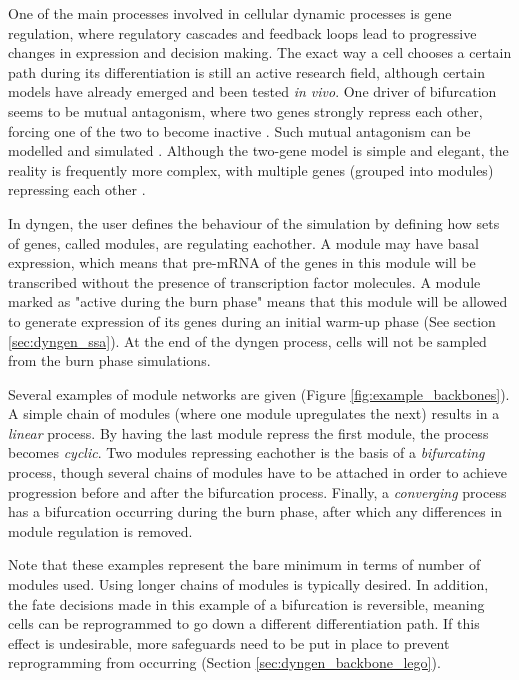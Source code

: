 One of the main processes involved in cellular dynamic processes is gene regulation, where regulatory cascades and feedback loops lead to progressive changes in expression and decision making. The exact way a cell chooses a certain path during its differentiation is still an active research field, although certain models have already emerged and been tested \textit{in vivo}. One driver of bifurcation seems to be mutual antagonism, where two genes \cite{xu_regulationbifurcatingcell_2015} strongly repress each other, forcing one of the two to become inactive \cite{graf_forcingcellschange_2009}. Such mutual antagonism can be modelled and simulated \cite{wang_quantifyingwaddingtonlandscape_2011, ferrell_bistabilitybifurcationswaddington_2012}. Although the two-gene model is simple and elegant, the reality is frequently more complex, with multiple genes (grouped into modules) repressing each other \cite{yosef_dynamicregulatorynetwork_2013}.

In dyngen, the user defines the behaviour of the simulation by defining how sets of genes, called modules, are regulating eachother.
A module may have basal expression, which means that pre-mRNA of the genes in this module will be transcribed without the presence of transcription factor molecules. A module marked as "active during the burn phase" means that this module will be allowed to generate expression of its genes during an initial warm-up phase (See section \ref{sec:dyngen_ssa}). At the end of the dyngen process, cells will not be sampled from the burn phase simulations.

Several examples of module networks are given (Figure \ref{fig:example_backbones}). 
A simple chain of modules (where one module upregulates the next) results in a \emph{linear} process. By having the last module repress the first module, the process becomes \emph{cyclic}. Two modules repressing eachother is the basis of a \emph{bifurcating} process, though several chains of modules have to be attached in order to achieve progression before and after the bifurcation process. Finally, a \emph{converging} process has a bifurcation occurring during the burn phase, after which any differences in module regulation is removed.

Note that these examples represent the bare minimum in terms of number of modules used. Using longer chains of modules is typically desired. In addition, the fate decisions made in this example of a bifurcation is reversible, meaning cells can be reprogrammed to go down a different differentiation path. If this effect is undesirable, more safeguards need to be put in place to prevent reprogramming from occurring (Section \ref{sec:dyngen_backbone_lego}).

